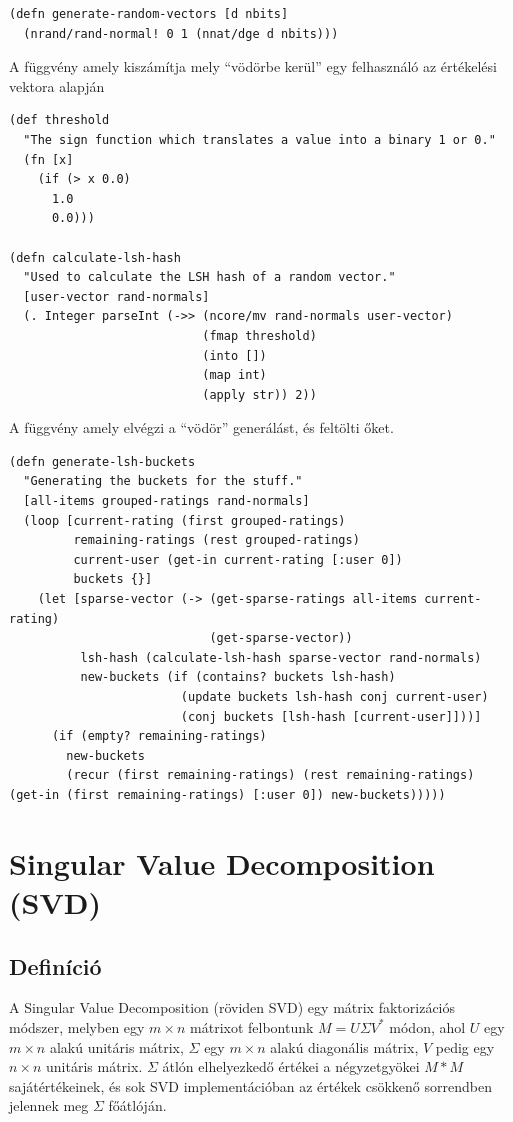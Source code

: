 \documentclass[final, 12pt] {ubb_dolgozat}{book}
\begin{document}
\begin{verbatim}
(defn generate-random-vectors [d nbits]
  (nrand/rand-normal! 0 1 (nnat/dge d nbits)))
\end{verbatim}

A függvény amely kiszámítja mely ``vödörbe kerül'' egy felhasználó az értékelési vektora alapján

\begin{verbatim}
(def threshold
  "The sign function which translates a value into a binary 1 or 0."
  (fn [x]
    (if (> x 0.0)
      1.0
      0.0)))

(defn calculate-lsh-hash
  "Used to calculate the LSH hash of a random vector."
  [user-vector rand-normals]
  (. Integer parseInt (->> (ncore/mv rand-normals user-vector)
                           (fmap threshold)
                           (into [])
                           (map int)
                           (apply str)) 2))

\end{verbatim}

A függvény amely elvégzi a ``vödör'' generálást, és feltölti őket.

\begin{verbatim}
(defn generate-lsh-buckets
  "Generating the buckets for the stuff."
  [all-items grouped-ratings rand-normals]
  (loop [current-rating (first grouped-ratings)
         remaining-ratings (rest grouped-ratings)
         current-user (get-in current-rating [:user 0])
         buckets {}]
    (let [sparse-vector (-> (get-sparse-ratings all-items current-rating)
                            (get-sparse-vector))
          lsh-hash (calculate-lsh-hash sparse-vector rand-normals)
          new-buckets (if (contains? buckets lsh-hash)
                        (update buckets lsh-hash conj current-user)
                        (conj buckets [lsh-hash [current-user]]))]
      (if (empty? remaining-ratings)
        new-buckets
        (recur (first remaining-ratings) (rest remaining-ratings) (get-in (first remaining-ratings) [:user 0]) new-buckets)))))
\end{verbatim}

\section{Singular Value Decomposition (SVD)}
\label{sec:org65ba81c}
\subsection{Definíció}
\label{sec:org408bf58}
A Singular Value Decomposition (röviden SVD) egy mátrix faktorizációs módszer, melyben egy \(m  \times  n\) mátrixot felbontunk
\(M=U \Sigma V^{*}\) módon, ahol \(U\) egy \(m \times n\) alakú unitáris mátrix, \(\Sigma\) egy \(m \times n\) alakú diagonális mátrix, \(V\) pedig egy \(n \times n\)
unitáris mátrix. \(\Sigma\) átlón elhelyezkedő értékei a négyzetgyökei \(M * M\) sajátértékeinek, és sok SVD implementációban az értékek
csökkenő sorrendben jelennek meg \(\Sigma\) főátlóján.
\end{document}
